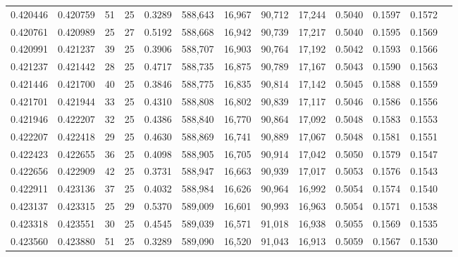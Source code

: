 \begin{tabular}{rrrrrrrrrrrrr}
0.420446 & 0.420759 &    51 &  25 &                                     0.3289 & 588,643 &  16,967 &  90,712 &  17,244 & 0.5040 & 0.1597 & 0.1572 \\
0.420761 & 0.420989 &    25 &  27 &                                     0.5192 & 588,668 &  16,942 &  90,739 &  17,217 & 0.5040 & 0.1595 & 0.1569 \\
0.420991 & 0.421237 &    39 &  25 &                                     0.3906 & 588,707 &  16,903 &  90,764 &  17,192 & 0.5042 & 0.1593 & 0.1566 \\
0.421237 & 0.421442 &    28 &  25 &                                     0.4717 & 588,735 &  16,875 &  90,789 &  17,167 & 0.5043 & 0.1590 & 0.1563 \\
0.421446 & 0.421700 &    40 &  25 &                                     0.3846 & 588,775 &  16,835 &  90,814 &  17,142 & 0.5045 & 0.1588 & 0.1559 \\
0.421701 & 0.421944 &    33 &  25 &                                     0.4310 & 588,808 &  16,802 &  90,839 &  17,117 & 0.5046 & 0.1586 & 0.1556 \\
0.421946 & 0.422207 &    32 &  25 &                                     0.4386 & 588,840 &  16,770 &  90,864 &  17,092 & 0.5048 & 0.1583 & 0.1553 \\
0.422207 & 0.422418 &    29 &  25 &                                     0.4630 & 588,869 &  16,741 &  90,889 &  17,067 & 0.5048 & 0.1581 & 0.1551 \\
0.422423 & 0.422655 &    36 &  25 &                                     0.4098 & 588,905 &  16,705 &  90,914 &  17,042 & 0.5050 & 0.1579 & 0.1547 \\
0.422656 & 0.422909 &    42 &  25 &                                     0.3731 & 588,947 &  16,663 &  90,939 &  17,017 & 0.5053 & 0.1576 & 0.1543 \\
0.422911 & 0.423136 &    37 &  25 &                                     0.4032 & 588,984 &  16,626 &  90,964 &  16,992 & 0.5054 & 0.1574 & 0.1540 \\
0.423137 & 0.423315 &    25 &  29 &                                     0.5370 & 589,009 &  16,601 &  90,993 &  16,963 & 0.5054 & 0.1571 & 0.1538 \\
0.423318 & 0.423551 &    30 &  25 &                                     0.4545 & 589,039 &  16,571 &  91,018 &  16,938 & 0.5055 & 0.1569 & 0.1535 \\
0.423560 & 0.423880 &    51 &  25 &                                     0.3289 & 589,090 &  16,520 &  91,043 &  16,913 & 0.5059 & 0.1567 & 0.1530 \\

\end{tabular}
